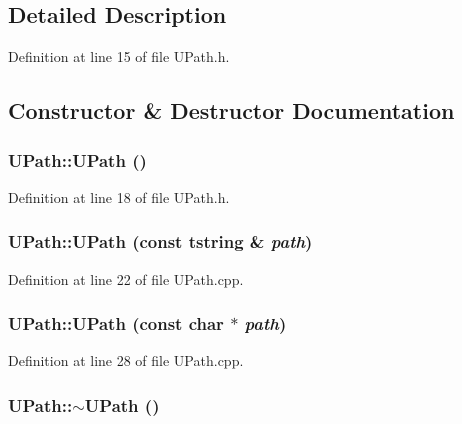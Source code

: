 \subsection{Detailed Description}


Definition at line 15 of file UPath.h.

\subsection{Constructor \& Destructor Documentation}
\hypertarget{class_u_path_46ed5eebdbc67d7603a43d2e62c279ae}{
\subsubsection[{UPath}]{\setlength{\rightskip}{0pt plus 5cm}UPath::UPath ()}}
\label{class_u_path_46ed5eebdbc67d7603a43d2e62c279ae}




Definition at line 18 of file UPath.h.\hypertarget{class_u_path_6a7dc514e2d2ab892b1d9e7e68a35a7d}{
\subsubsection[{UPath}]{\setlength{\rightskip}{0pt plus 5cm}UPath::UPath (const {\bf tstring} \& {\em path})}}
\label{class_u_path_6a7dc514e2d2ab892b1d9e7e68a35a7d}




Definition at line 22 of file UPath.cpp.\hypertarget{class_u_path_9eea4f4ccc45d8cede172251da61b3da}{
\subsubsection[{UPath}]{\setlength{\rightskip}{0pt plus 5cm}UPath::UPath (const char $\ast$ {\em path})}}
\label{class_u_path_9eea4f4ccc45d8cede172251da61b3da}




Definition at line 28 of file UPath.cpp.\hypertarget{class_u_path_0976c621ce738265f5c694d8364f782a}{
\subsubsection[{$\sim$UPath}]{\setlength{\rightskip}{0pt plus 5cm}UPath::$\sim$UPath ()}}
\label{class_u_path_0976c621ce738265f5c694d8364f782a}





